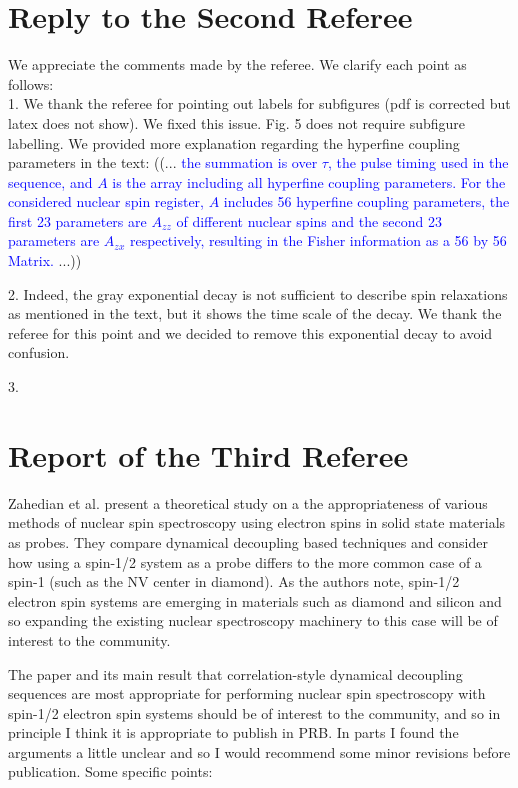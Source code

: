 \documentclass[12pt]{amsart}
\begin{document}
	\color{black} \section*{Reply to the Second Referee}
	We appreciate the comments made by the referee. We clarify each point as follows:\\
	1. We thank the referee for pointing out labels for subfigures (pdf is corrected but latex does not show). We fixed this issue. Fig. 5 does not require subfigure labelling. We provided more explanation regarding the hyperfine coupling parameters in the text:
	((... \textcolor{blue}{the summation is over $\tau$, the pulse timing used in the sequence, and $A$ is the array including all hyperfine coupling parameters. For the considered nuclear spin register, $A$ includes 56 hyperfine coupling parameters, the first 23 parameters are $A_{zz}$ of different nuclear spins and the second 23 parameters are $A_{zx}$ respectively, resulting in the Fisher information as a 56 by 56 Matrix.} ...))   
	
	2. Indeed, the gray exponential decay is not sufficient to describe spin relaxations as mentioned in the text, but it shows the time scale of the decay. We thank the referee for this point and we decided to remove this exponential decay to avoid confusion.
	
	3.
	

	\color{red} \section{Report of the Third Referee}
	Zahedian et al. present a theoretical study on a the appropriateness of
	various methods of nuclear spin spectroscopy using electron spins in
	solid state materials as probes. They compare dynamical decoupling
	based techniques and consider how using a spin-1/2 system as a probe
	differs to the more common case of a spin-1 (such as the NV center in
	diamond). As the authors note, spin-1/2 electron spin systems are
	emerging in materials such as diamond and silicon and so expanding the
	existing nuclear spectroscopy machinery to this case will be of
	interest to the community.
	
	The paper and its main result that correlation-style dynamical
	decoupling sequences are most appropriate for performing nuclear spin
	spectroscopy with spin-1/2 electron spin systems should be of interest
	to the community, and so in principle I think it is appropriate to
	publish in PRB. In parts I found the arguments a little unclear and so
	I would recommend some minor revisions before publication. Some
	specific points:
	
\end{document}
